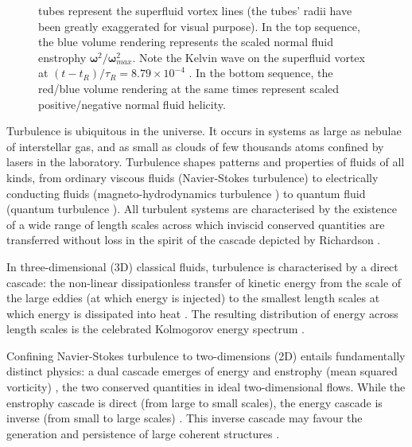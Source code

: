 \documentclass[%
 reprint,
 amsmath,amssymb,
 aps,
 prl,
]{revtex4-2}
\newcommand{\bom}{\boldsymbol{\omega}}
\def\magenta#1{\textcolor{magenta}{#1}}
\begin{document}
\begin{figure}
{tubes represent the superfluid vortex lines (the tubes’ radii have been 
greatly exaggerated for visual purpose). In the top sequence,
the blue volume rendering represents the scaled normal fluid enstrophy 
$\bom^2/\bom^2_{max}$. Note the Kelvin wave on the superfluid
vortex at $(t-t_R)/\tau_R=8.79\times10^{-4}$ . In the bottom sequence, the red/blue volume
rendering at the same times represent scaled positive/negative normal fluid
helicity.	
}
    \label{fig:visualisation}
\end{figure}

Turbulence is ubiquitous in the universe.  It occurs in systems
as large as nebulae of interstellar gas, and as small as clouds of
few thousands atoms confined by lasers in the laboratory.
Turbulence shapes patterns and properties of fluids of all
kinds, from ordinary
 viscous fluids (Navier-Stokes turbulence\cite{frisch1995}) 
to electrically conducting fluids (magneto-hydrodynamics turbulence
\cite{canuto-dalsgaard-1998}) to quantum fluid
(quantum turbulence \cite{barenghi-etal-2023,
Barenghi_Skrbek_Sreenivasan_2023}).
All turbulent systems are characterised by 
the existence of a wide range 
of length scales across which inviscid conserved quantities 
are transferred without loss in the spirit of the cascade 
depicted by Richardson \cite{richardson1922weather}. 

In three-dimensional (3D) classical fluids, turbulence 
is characterised by a direct cascade: the
non-linear dissipationless transfer of kinetic energy from the scale of
the large eddies (at which energy is injected) to the smallest length scales
at which energy is dissipated into heat
\cite{richardson1922weather,kolmogorov-1941}. 
The resulting distribution of energy across length scales is
the celebrated Kolmogorov energy spectrum 
\cite{kolmogorov-1941,frisch1995}. 

Confining Navier-Stokes turbulence to two-dimensions (2D) entails 
fundamentally distinct physics: a dual cascade emerges of energy and enstrophy 
(mean squared vorticity) \cite{kraichnan-1967,boffetta-ecke-2012}, 
the two conserved quantities in ideal two-dimensional flows.
While the enstrophy cascade is direct (from large to small
scales), the energy cascade is inverse (from small to large scales)
\cite{boffetta-musacchio-2010}. This inverse cascade 
may favour the generation and persistence of large coherent 
structures \cite{laurie-etal-2014}. 
\end{document}
